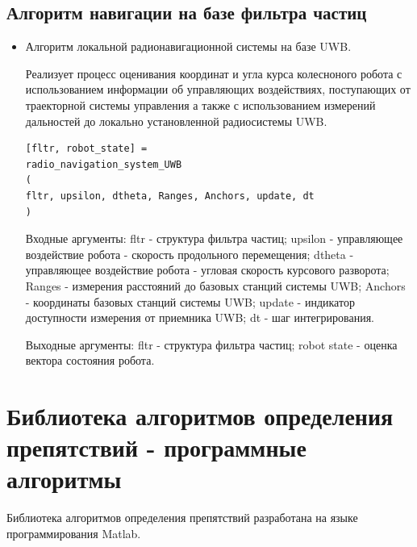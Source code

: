 \documentclass[14pt]{article}
\begin{document}
\subsection{Алгоритм навигации на базе фильтра частиц}

\begin{itemize}
\item Алгоритм локальной радионавигационной системы на базе UWB.

Реализует процесс оценивания координат и угла курса колесноного робота с использованием информации об управляющих воздействиях, поступающих от траекторной системы управления а также с использованием измерений дальностей до локально установленной радиосистемы UWB. 

\begin{verbatim}
[fltr, robot_state] = 
radio_navigation_system_UWB
(
fltr, upsilon, dtheta, Ranges, Anchors, update, dt
)
\end{verbatim}

Входные аргументы: fltr - структура фильтра частиц; upsilon - управляющее воздействие робота - скорость продольного перемещения; dtheta - управляющее воздействие робота - угловая скорость курсового
разворота; Ranges - измерения расстояний до базовых станций системы UWB; Anchors - координаты базовых станций системы UWB; update - индикатор доступности измерения от приемника UWB;
dt - шаг интегрирования.

Выходные аргументы: fltr - структура фильтра частиц; robot state - оценка вектора состояния робота.

\end{itemize}


\section{Библиотека алгоритмов определения препятствий - программные алгоритмы}

Библиотека алгоритмов определения препятствий разработана на языке программирования Matlab.
\end{document}
